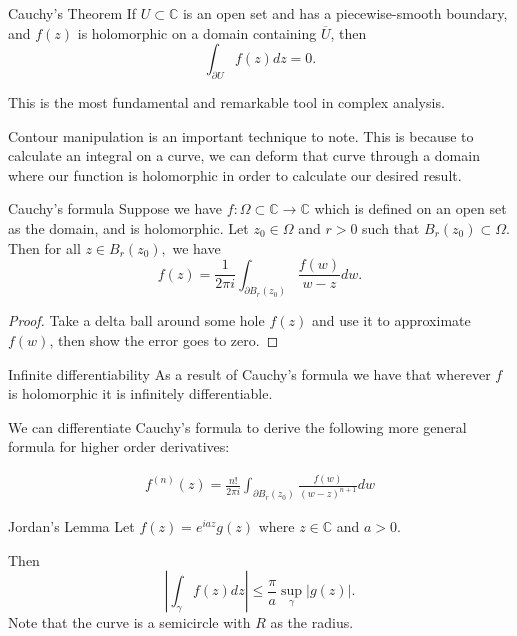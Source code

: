 \documentclass{article}
\begin{document}
\begin{thrm}{Cauchy's Theorem}{}
If \( U \subset \mathbb{C}  \) is an open set and has a piecewise-smooth boundary, and \( f(z) \) is holomorphic on a domain containing \( \overline{U}  \), then
\[
    \int _{\partial U } f(z) dz = 0.
\]

This is the most fundamental and remarkable tool in complex analysis.

\end{thrm}


Contour manipulation is an important technique to note. This is because to calculate an integral on a curve, we can deform that curve through a domain where our function is holomorphic in order to calculate our desired result. 

\begin{thrm}{Cauchy's formula}{}   
Suppose we have \( f: \Omega \subset \mathbb{C}  \to \mathbb{C}  \) which is defined on an open set as the domain, and is holomorphic. Let \( z_0 \in \Omega  \) and \( r > 0 \) such that \( B_r(z_0) \subset \Omega  \). Then for all \( z \in B_ r(z_0), \) we have 
\[
    f(z) = \frac{1}{2\pi i}\int _{\partial B_r(z_0)}\frac{f(w)}{w - z}dw. 
\]

\tcbline
\begin{proof}
Take a delta ball around some hole \( f(z) \)  and use it to approximate \( f(w) \), then show the error goes to zero. \end{proof}

\end{thrm}

\begin{cor}{Infinite differentiability}{}
As a result of Cauchy's formula we have that wherever \( f \) is holomorphic it is infinitely differentiable. 

We can differentiate Cauchy's formula to derive the following more general formula for higher order derivatives:

\begin{align*}
    \boxed{f^{(n)}(z) = \frac{n!}{2\pi i}\int _{\partial B_r(z_0) } \frac{f(w)}{(w - z)^{n+ 1} } dw }
\end{align*}

\end{cor}

\begin{lem}{Jordan's Lemma}{}
Let \( f(z) = e^{iaz}g(z)  \)  where \( z \in \mathbb{C} \) and \( a > 0 \).

Then
\[
    \left\lvert \int _\gamma f(z) dz \right\rvert \leq \frac{\pi}{a}\sup _{\gamma }\left\lvert g(z) \right\rvert .
\]
Note that the curve is a semicircle with \( R \) as the radius.
\end{lem}
\end{document}
